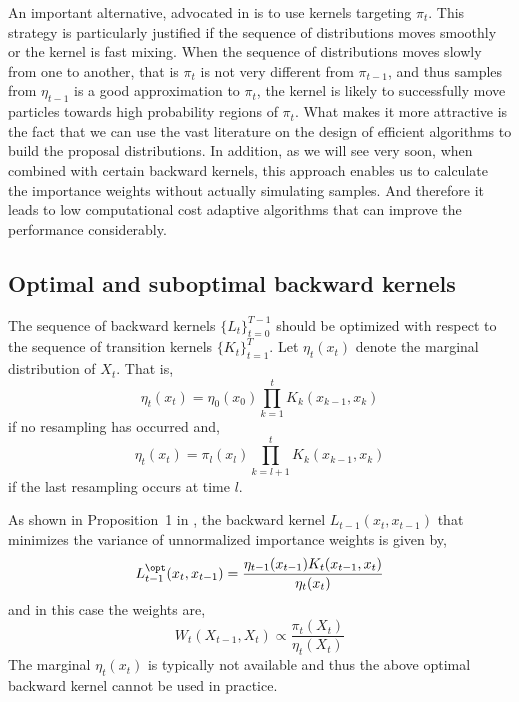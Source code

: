 An important alternative, advocated in \cite{DelMoral:2006hc} is to use \mcmc kernels targeting $\pi_t$. This strategy is particularly justified if the sequence of distributions moves smoothly or the kernel is fast mixing. When the sequence of distributions moves slowly from one to another, that is $\pi_t$ is not very different from $\pi_{t-1}$, and thus samples from $\eta_{t-1}$ is a good approximation to $\pi_t$, the kernel is likely to successfully move particles towards high probability regions of $\pi_t$. What makes it more attractive is the fact that we can use the vast literature on the design of efficient \mcmc algorithms to build the proposal distributions. In addition, as we will see very soon, when combined with certain backward kernels, this approach enables us to calculate the importance weights without actually simulating samples. And therefore it leads to low computational cost adaptive algorithms that can improve the performance considerably.

\subsection{Optimal and suboptimal backward kernels}
\label{sub:Optimal and suboptimal backward kernels}

The sequence of backward kernels $\{L_t\}_{t=0}^{T-1}$ should be optimized with respect to the sequence of transition kernels $\{K_t\}_{t=1}^T$. Let $\eta_t(x_t)$ denote the marginal distribution of $X_t$. That is,
\begin{equation}
  \eta_t(x_t) = \eta_0(x_0)\prod_{k=1}^tK_k(x_{k-1},x_k)
\end{equation}
if no resampling has occurred and,
\begin{equation}
  \eta_t(x_t) = \pi_l(x_l)\prod_{k=l+1}^tK_k(x_{k-1},x_k)
\end{equation}
if the last resampling occurs at time $l$.

As shown in Proposition~1{} in \cite{DelMoral:2006hc}, the backward kernel $L_{t-1}(x_t, x_{t-1})$ that minimizes the variance of unnormalized importance weights is given by,
\begin{equation}
  L_{t-1}^{\opt}(x_t,x_{t-1}) =
  \frac{\eta_{t-1}(x_{t-1})K_t(x_{t-1},x_t)}{\eta_t(x_t)}
\end{equation}
and in this case the weights are,
\begin{equation}
  W_t(X_{t-1},X_t) \propto \frac{\pi_t(X_t)}{\eta_t(X_t)}
\end{equation}
The marginal $\eta_t(x_t)$ is typically not available and thus the above optimal backward kernel cannot be used in practice.

